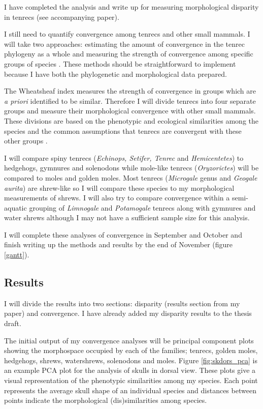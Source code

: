 \documentclass[12pt,a4paper]{article}
\begin{document}
	I have completed the analysis and write up for measuring morphological disparity in tenrecs (see accompanying paper).
	
	I still need to quantify convergence among tenrecs and other small mammals. I will take two approaches: estimating the amount of convergence in the tenrec phylogeny as a whole \citep{Stayton2008} and measuring the strength of convergence among specific groups of species \citep{Arbuckle2014}. These methods should be straightforward to implement because I have both the phylogenetic and morphological data prepared. 
	
	The Wheatsheaf index \citep{Arbuckle2014} measures the strength of convergence in groups which are \textit{a priori} identified to be similar. Therefore I will divide tenrecs into four separate groups and measure their morphological convergence with other small mammals. These divisions are based on the phenotypic and ecological similarities among the species and the common assumptions that tenrecs are convergent with these other groups \citep[e.g.][]{Soarimalala2011, Olson2013}. 
	
	I will compare spiny tenrecs (\textit{Echinops, Setifer, Tenrec} and \textit{Hemicentetes}) to hedgehogs, gymnures and solenodons while mole-like tenrecs (\textit{Oryzorictes}) will be compared to moles and golden moles. Most tenrecs (\textit{Microgale} genus and \textit{Geogale aurita}) are shrew-like so I will compare these species to my morphological measurements of shrews. I will also try to compare convergence within a semi-aquatic grouping of \textit{Limnogale} and \textit{Potamogale} tenrecs along with gymnures and water shrews although I may not have a sufficient sample size for this analysis. 
		
	I will complete these analyses of convergence in September and October and finish writing up the methods and results by the end of November (figure \ref{gantt}).

 
\subsection{Results}
	
	I will divide the results into two sections: disparity (results section from my paper) and convergence. I have already added my disparity results to the thesis draft.
	
	The initial output of my convergence analyses will be principal component plots showing the morphospace occupied by each of the families; tenrecs, golden moles, hedgehogs, shrews, watershrews, solenodons and moles. Figure \ref{fig:skdors_pca} is an example PCA plot for the analysis of skulls in dorsal view. These plots give a visual representation of the phenotypic similarities among my species. Each point represents the average skull shape of an individual species and distances between points indicate the morphological (dis)similarities among species.
	
\end{document}
